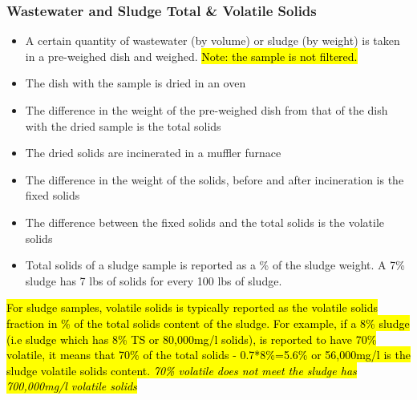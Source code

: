 	\subsubsection{Wastewater and Sludge Total \& Volatile Solids}
\vspace{0.4cm}
\begin{itemize}
\setlength\itemsep{1em}
					\item A certain quantity of wastewater (by volume) or sludge (by weight) is taken in a pre-weighed dish and weighed.  \hl{Note:  the sample is not filtered.}
					\item The dish with the sample is dried in an oven
					\item The difference in the weight of the pre-weighed dish from that of the dish with the dried sample is the total solids
					\item The dried solids are incinerated in a muffler furnace
					\item The difference in the weight of the solids, before and after incineration is the fixed solids
					\item The difference between the fixed solids and the total solids is the volatile solids
					\item Total solids of a sludge sample is reported as a \% of the sludge weight.  A 7\% sludge has 7 lbs of solids for every 100 lbs of sludge.
				\end{itemize}
				
				\hl{For sludge samples, volatile solids is typically reported as the volatile solids fraction in \% of the total solids content of the sludge.  For example, if a 8\% sludge (i.e sludge which has 8\% TS or 80,000mg/l solids), is reported to have 70\% volatile, it means that 70\% of the total solids - 0.7*8\%=5.6\% or 56,000mg/l is the sludge volatile solids content.  \emph{70\% volatile does not meet the sludge has 700,000mg/l volatile solids}}\\	

